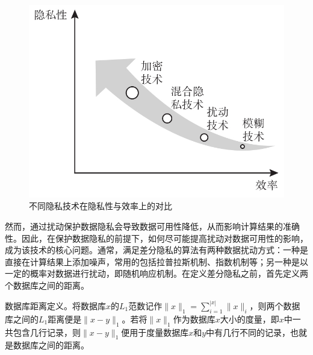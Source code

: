 \begin{figure}[htb]
\centering
    \includegraphics[scale=1.5]{figures/chapter4/Comparison of privacy and efficiency of different privacy technologies.jpg}
    \caption{不同隐私技术在隐私性与效率上的对比}
    \label{fig:three major privacy guarantees}
\end{figure}

然而，通过扰动保护数据隐私会导致数据可用性降低，从而影响计算结果的准确性。因此，在保护数据隐私的前提下，如何尽可能提高扰动对数据可用性的影响，成为该技术的核心问题。通常，满足差分隐私的算法有两种数据扰动方式：一种是直接在计算结果上添加噪声，常用的包括拉普拉斯机制、指数机制等；另一种是以一定的概率对数据进行扰动，即随机响应机制。在定义差分隐私之前，首先定义两个数据库之间的距离。

数据库距离定义。将数据库$x$的$L_1$范数记作$\parallel x\parallel_1=\sum_{i=1}^{| x|}\parallel x\parallel_i$，则两个数据库之间的$L_1$距离便是$\parallel x-y\parallel_1$。若将$\parallel x\parallel_1$作为数据库$x$大小的度量，即$x$中一共包含几行记录，则$\parallel x-y\parallel_1$便用于度量数据库$x$和$y$中有几行不同的记录，也就是数据库之间的距离。

